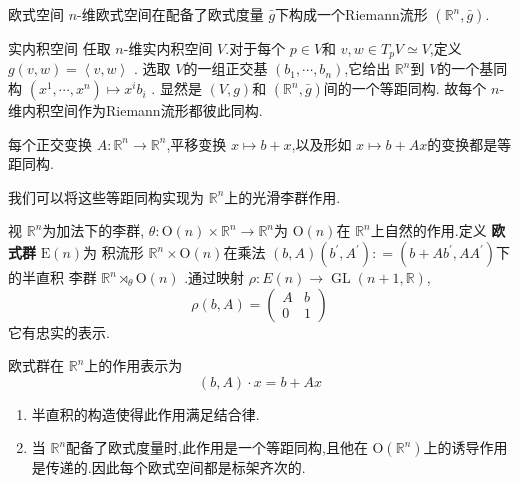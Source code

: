 \documentclass[../../几何与拓扑.tex]{subfiles}
\begin{document}
\begin{proposition}{欧式空间}
    \(  n  \)-维欧式空间在配备了欧式度量 \(  \bar{g}  \)下构成一个Riemann流形 \(  \left( \mathbb{R} ^{n},\bar{g} \right)   \).   
\end{proposition}

\begin{proposition}{实内积空间}
    任取 \(  n  \)-维实内积空间 \(  V  \).对于每个 \(  p \in V  \)和 \(  v,w \in T_{p}V\simeq V  \),定义   \(  g\left( v,w \right)= \left<v,w \right>   \)   .
    选取 \(  V  \)的一组正交基 \(  \left(  b_1,\cdots,b_n  \right)   \),它给出 \(  \mathbb{R} ^{n}  \)到 \(  V  \)的一个基同构 \(  \left( x^{1},\cdots ,x^{n} \right)\mapsto x^{i}b_{i}   \)     .
    显然是 \(  \left( V,g \right)   \)和 \(  \left( \mathbb{R} ^{n},\bar{g} \right)   \)间的一个等距同构.  故每个 \(  n  \)-维内积空间作为Riemann流形都彼此同构. 
\end{proposition}

每个正交变换 \(  A:\mathbb{R} ^{n}\to \mathbb{R} ^{n}  \),平移变换 \(  x\mapsto b+ x  \),以及形如 \(  x\mapsto b+ Ax  \)的变换都是等距同构.

我们可以将这些等距同构实现为 \(  \mathbb{R} ^{n}  \)上的光滑李群作用.

\begin{definition}
    视 \(  \mathbb{R} ^{n}  \)为加法下的李群, \(   \theta :\mathrm{O}\left( n \right)\times \mathbb{R} ^{n}\to \mathbb{R} ^{n}   \)为 \(  \mathrm{O}\left( n \right)   \)在 \(  \mathbb{R} ^{n}  \)上自然的作用.定义 \textbf{欧式群} \(  \mathrm{E}\left( n \right)   \)为 积流形 \(  \mathbb{R} ^{n}\times  \mathrm{O}\left( n \right)   \)在乘法 \(  \left( b,A \right)\left( b^{\prime} ,A^{\prime}  \right): =  \left( b+ Ab^{\prime}  ,AA^{\prime} \right)     \)下的半直积 李群 \(  \mathbb{R} ^{n}  \rtimes _{ \theta } \mathrm{O}\left( n \right) \)    .通过映射 \(  \rho : E\left( n \right)\to \operatorname{GL} \left( n+ 1,\mathbb{R}  \right)    \), \[
    \rho \left( b,A \right) = \begin{pmatrix} 
        A&b\\ 
         0&1 
    \end{pmatrix}  
    \]它有忠实的表示.  
    
    欧式群在 \(  \mathbb{R} ^{n}  \)上的作用表示为 \[
    \left( b,A \right)\cdot x =  b+ Ax 
    \] 
\end{definition}

\begin{remark}
   \begin{enumerate}
    \item  半直积的构造使得此作用满足结合律.
    \item  当 \(  \mathbb{R} ^{n}  \)配备了欧式度量时,此作用是一个等距同构,且他在 \(  \mathrm{O}\left( \mathbb{R} ^{n} \right)   \)上的诱导作用是传递的.因此每个欧式空间都是标架齐次的.  
   \end{enumerate}
   
\end{remark}
\end{document}
